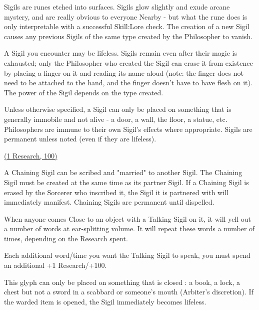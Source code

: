 {

Sigils are runes etched into surfaces.  Sigils glow slightly and exude arcane mystery, and are really obvious to everyone Nearby - but what the rune does is only interpretable with a successful Skill:Lore check.  The creation of a new Sigil causes any previous Sigils of the same type created by the Philosopher to vanish.

A Sigil you encounter may be lifeless.  Sigils remain even after their magic is exhausted; only the Philosopher who created the Sigil can erase it from existence by placing a finger on it and reading its name aloud (note: the finger does not need to be attached to the hand, and the finger doesn't have to have flesh on it).  The power of the Sigil depends on the type created.

Unless otherwise specified, a Sigil can only be placed on something that is generally immobile and not alive - a door, a wall, the floor, a statue, etc.  Philosophers are immune to their own Sigil's effects where appropriate.  Sigils are permanent unless noted (even if they are lifeless).

\cbreak

\large{\underline{ (1 Research, 100\FE)}}\normalsize


A Chaining Sigil can be scribed and "married" to another Sigil.  The Chaining Sigil must be created at the same time as its partner Sigil.  If a Chaining Sigil is erased by the Sorcerer who inscribed it, the Sigil it is partnered with will immediately manifest.  Chaining Sigils are permanent until dispelled.


When anyone comes Close to an object with a Talking Sigil on it, it will yell out a number of words at ear-splitting volume.  It will repeat these words a number of times, depending on the Research spent.

Each additional word/time you want the Talking Sigil to speak, you must spend an additional +1 Research/+100\FE.



This glyph can only be placed on something that is closed : a book, a lock, a chest but not a sword in a scabbard or someone's mouth (Arbiter's discretion).  If the warded item is opened, the Sigil immediately becomes lifeless.

}
